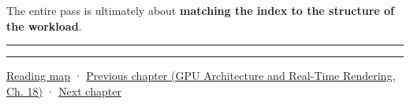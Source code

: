 The entire pass is ultimately about \textbf{matching the index to the structure of the workload}.

\begin{center}\rule{0.5\linewidth}{0.5pt}\end{center}

\begin{center}\rule{0.5\linewidth}{0.5pt}\end{center}

\hyperref[volume-reading-map]{Reading map} · \href{../06-GPU-Architecture-and-Real-Time-Rendering/main.pdf\#nameddest=06-engine-ii-ch027-preparing-and-publishing-runtime-content}{Previous chapter (GPU Architecture and Real-Time Rendering, Ch. 18)} · \hyperref[06-engine-ii-ch029-dynamic-spatial-indices-for-moving-worlds]{Next chapter}
